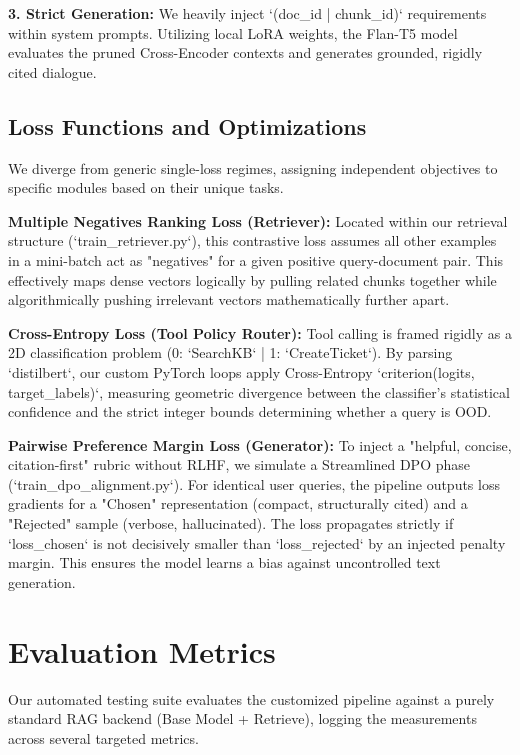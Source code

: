 \documentclass[11pt]{article}
\begin{document}
\textbf{3. Strict Generation:} 
We heavily inject `(doc\_id | chunk\_id)` requirements within system prompts. Utilizing local LoRA weights, the Flan-T5 model evaluates the pruned Cross-Encoder contexts and generates grounded, rigidly cited dialogue.

\subsection{Loss Functions and Optimizations}
We diverge from generic single-loss regimes, assigning independent objectives to specific modules based on their unique tasks.

\textbf{Multiple Negatives Ranking Loss (Retriever):} 
Located within our retrieval structure (`train_retriever.py`), this contrastive loss assumes all other examples in a mini-batch act as "negatives" for a given positive query-document pair. This effectively maps dense vectors logically by pulling related chunks together while algorithmically pushing irrelevant vectors mathematically further apart.

\textbf{Cross-Entropy Loss (Tool Policy Router):}
Tool calling is framed rigidly as a 2D classification problem (0: `SearchKB` | 1: `CreateTicket`). By parsing `distilbert`, our custom PyTorch loops apply Cross-Entropy `criterion(logits, target_labels)`, measuring geometric divergence between the classifier's statistical confidence and the strict integer bounds determining whether a query is OOD.

\textbf{Pairwise Preference Margin Loss (Generator):}
To inject a "helpful, concise, citation-first" rubric without RLHF, we simulate a Streamlined DPO phase (`train_dpo_alignment.py`). For identical user queries, the pipeline outputs loss gradients for a "Chosen" representation (compact, structurally cited) and a "Rejected" sample (verbose, hallucinated). The loss propagates strictly if `loss_chosen` is not decisively smaller than `loss_rejected` by an injected penalty margin. This ensures the model learns a bias against uncontrolled text generation.

\section{Evaluation Metrics}

Our automated testing suite evaluates the customized pipeline against a purely standard RAG backend (Base Model + Retrieve), logging the measurements across several targeted metrics.
\end{document}
